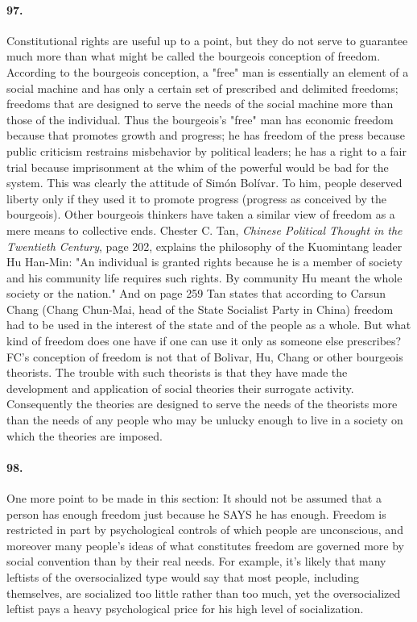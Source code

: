 \documentclass[12pt]{book}
\begin{document}
\paragraph{97.} Constitutional rights are useful up to a point, but they do not serve to guarantee much more than what might be called the bourgeois conception of freedom. According to the bourgeois conception, a "free" man is essentially an element of a social machine and has only a certain set of prescribed and delimited freedoms; freedoms that are designed to serve the needs of the social machine more than those of the individual. Thus the bourgeois's "free" man has economic freedom because that promotes growth and progress; he has freedom of the press because public criticism restrains misbehavior by political leaders; he has a right to a fair trial because imprisonment at the whim of the powerful would be bad for the system. This was clearly the attitude of Simón Bolívar. To him, people deserved liberty only if they used it to promote progress (progress as conceived by the bourgeois). Other bourgeois thinkers have taken a similar view of freedom as a mere means to collective ends. Chester C. Tan, \emph{Chinese Political Thought in the Twentieth Century}, page 202, explains the philosophy of the Kuomintang leader Hu Han-Min: "An individual is granted rights because he is a member of society and his community life requires such rights. By community Hu meant the whole society or the nation." And on page 259 Tan states that according to Carsun Chang (Chang Chun-Mai, head of the State Socialist Party in China) freedom had to be used in the interest of the state and of the people as a whole. But what kind of freedom does one have if one can use it only as someone else prescribes? FC's conception of freedom is not that of Bolivar, Hu, Chang or other bourgeois theorists. The trouble with such theorists is that they have made the development and application of social theories their surrogate activity. Consequently the theories are designed to serve the needs of the theorists more than the needs of any people who may be unlucky enough to live in a society on which the theories are imposed.


\paragraph{98.} One more point to be made in this section: It should not be assumed that a person has enough freedom just because he SAYS he has enough.  Freedom is restricted in part by psychological controls of which people are unconscious, and moreover many people's ideas of what constitutes freedom are governed more by social convention than by their real needs. For example, it's likely that many leftists of the oversocialized type would say that most people, including themselves, are socialized too little rather than too much, yet the oversocialized leftist pays a heavy psychological price for his high level of socialization.
\end{document}
